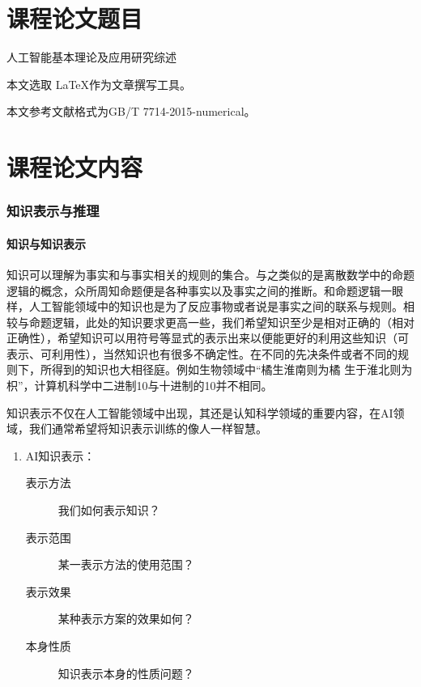 \documentclass[12pt,a4paper,UTF8]{ctexart}
\begin{document}
\tableofcontents

\part{课程论文题目}
人工智能基本理论及应用研究综述

本文选取 \LaTeX 作为文章撰写工具。

本文参考文献格式为GB/T 7714-2015-numerical。
\part{课程论文内容}
\section{知识表示与推理}
\subsection{知识与知识表示}
\textrm{知识可以理解为事实和与事实相关的规则的集合。与之类似的是离散数学中的命题逻辑的概念，众所周知命题便是各种事实以及事实之间的推断。和命题逻辑一眼样，人工智能领域中的知识也是为了反应事物或者说是事实之间的联系与规则。相较与命题逻辑，此处的知识要求更高一些，我们希望知识至少是相对正确的（相对正确性），希望知识可以用符号等显式的表示出来以便能更好的利用这些知识（可表示、可利用性），当然知识也有很多不确定性。在不同的先决条件或者不同的规则下，所得到的知识也大相径庭。例如生物领域中“橘生淮南则为橘 生于淮北则为枳”，计算机科学中二进制10与十进制的10并不相同。}

\textrm{知识表示不仅在人工智能领域中出现，其还是认知科学领域的重要内容，在AI领域，我们通常希望将知识表示训练的像人一样智慧。}

\begin{enumerate}
    \item AI知识表示：
    \begin{description}
        \item [表示方法] 我们如何表示知识？
        \item [表示范围] 某一表示方法的使用范围？
        \item [表示效果] 某种表示方案的效果如何？
        \item [本身性质] 知识表示本身的性质问题？
    \end{description}
\end{enumerate}
\end{document}
